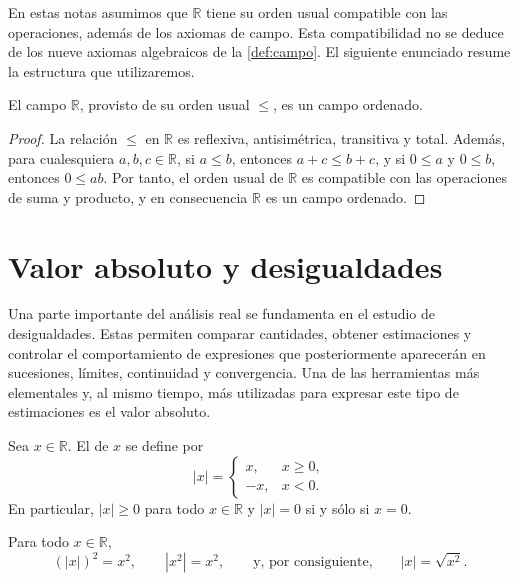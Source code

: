 En estas notas asumimos que $\mathbb{R}$ tiene su orden usual compatible con las operaciones, además de los axiomas de campo. Esta compatibilidad no se deduce de los nueve axiomas algebraicos de la \cref{def:campo}. El siguiente enunciado resume la estructura que utilizaremos.

\begin{samepage}
\begin{proposition}
El campo $\mathbb{R}$, provisto de su orden usual $\leq$, es un campo ordenado.
\end{proposition}
\end{samepage}

\begin{proof}
La relación $\leq$ en $\mathbb{R}$ es reflexiva, antisimétrica, transitiva y total. Además, para cualesquiera $a,b,c\in\mathbb{R}$, si $a\leq b$, entonces $a+c\leq b+c$, y si $0\leq a$ y $0\leq b$, entonces $0\leq ab$. Por tanto, el orden usual de $\mathbb{R}$ es compatible con las operaciones de suma y producto, y en consecuencia $\mathbb{R}$ es un campo ordenado.
\end{proof}

\section{Valor absoluto y desigualdades}
\label{sec:valor-absoluto}
Una parte importante del análisis real se fundamenta en el estudio de desigualdades. Estas permiten comparar cantidades, obtener estimaciones y controlar el comportamiento de expresiones que posteriormente aparecerán en sucesiones, límites, continuidad y convergencia. Una de las herramientas más elementales y, al mismo tiempo, más utilizadas para expresar este tipo de estimaciones es el valor absoluto.

\begin{samepage}
\begin{definition}
\label{def:valor-absoluto}
Sea $x\in\mathbb{R}$. El  de $x$ se define por
\[
|x|=
\begin{cases}
x, & x\geq0,\\
-x, & x<0.
\end{cases}
\]
En particular, $|x|\geq0$ para todo $x\in\mathbb{R}$ y $|x|=0$ si y sólo si $x=0$.
\end{definition}
\end{samepage}

\begin{samepage}
\begin{proposition}
\label{prop:absoluto-cuadrado}
Para todo $x\in\mathbb{R}$,
\[
(|x|)^2=x^2,
\qquad
|x^2|=x^2,
\qquad\text{y, por consiguiente,}\qquad
|x|=\sqrt{x^2}.
\]
\end{proposition}
\end{samepage}

